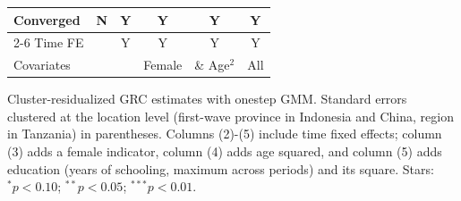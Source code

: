 \begin{table}[htbp]
\begin{threeparttable}
\begin{tabular}{l ccccc}
Converged           &           N   &           Y   &           Y   &           Y   &           Y   \\
\cmidrule{2-6} Time FE & & Y & Y & Y & Y \\ Covariates & & & Female & \& Age$^2$ & All \\ \bottomrule \end{tabular} \begin{tablenotes}[flushleft] \footnotesize \item{Cluster-residualized GRC estimates with onestep GMM. Standard errors clustered at the location level (first-wave province in Indonesia and China, region in Tanzania) in parentheses. Columns (2)-(5) include time fixed effects; column (3) adds a female indicator, column (4) adds age squared, and column (5) adds education (years of schooling, maximum across periods) and its square. Stars: $^{*} p<0.10$; $^{**} p<0.05$; $^{***} p<0.01$.} \end{tablenotes} \end{threeparttable} \end{table}
